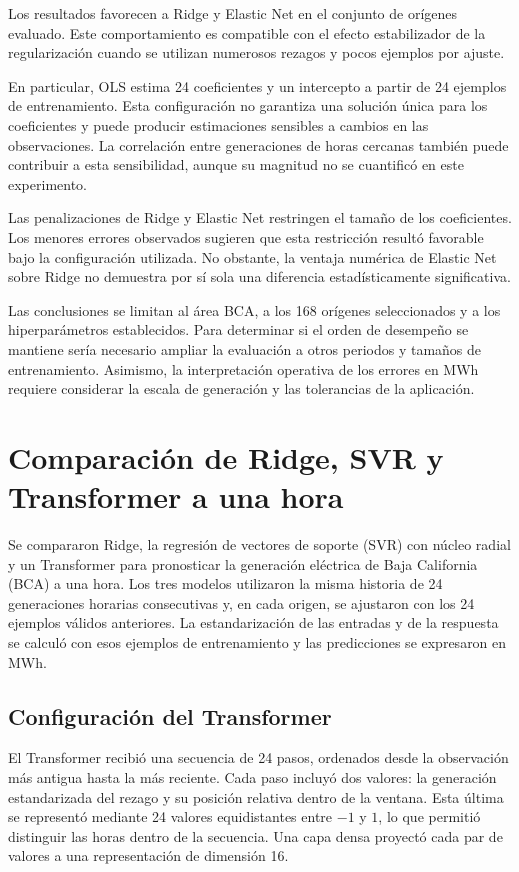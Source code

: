 Los resultados favorecen a Ridge y Elastic Net en el conjunto de orígenes evaluado. Este comportamiento es compatible con el efecto estabilizador de la regularización cuando se utilizan numerosos rezagos y pocos ejemplos por ajuste.

En particular, OLS estima 24 coeficientes y un intercepto a partir de 24 ejemplos de entrenamiento. Esta configuración no garantiza una solución única para los coeficientes y puede producir estimaciones sensibles a cambios en las observaciones. La correlación entre generaciones de horas cercanas también puede contribuir a esta sensibilidad, aunque su magnitud no se cuantificó en este experimento.

Las penalizaciones de Ridge y Elastic Net restringen el tamaño de los coeficientes. Los menores errores observados sugieren que esta restricción resultó favorable bajo la configuración utilizada. No obstante, la ventaja numérica de Elastic Net sobre Ridge no demuestra por sí sola una diferencia estadísticamente significativa.

Las conclusiones se limitan al área BCA, a los 168 orígenes seleccionados y a los hiperparámetros establecidos. Para determinar si el orden de desempeño se mantiene sería necesario ampliar la evaluación a otros periodos y tamaños de entrenamiento. Asimismo, la interpretación operativa de los errores en MWh requiere considerar la escala de generación y las tolerancias de la aplicación.

\section{Comparación de Ridge, SVR y Transformer a una hora}
\label{sec:comparacion-ridge-svr-transformer}

Se compararon Ridge, la regresión de vectores de soporte (SVR) con núcleo radial y un Transformer para pronosticar la generación eléctrica de Baja California (BCA) a una hora. Los tres modelos utilizaron la misma historia de 24 generaciones horarias consecutivas y, en cada origen, se ajustaron con los 24 ejemplos válidos anteriores. La estandarización de las entradas y de la respuesta se calculó con esos ejemplos de entrenamiento y las predicciones se expresaron en MWh.

\subsection{Configuración del Transformer}

El Transformer recibió una secuencia de 24 pasos, ordenados desde la observación más antigua hasta la más reciente. Cada paso incluyó dos valores: la generación estandarizada del rezago y su posición relativa dentro de la ventana. Esta última se representó mediante 24 valores equidistantes entre \(-1\) y \(1\), lo que permitió distinguir las horas dentro de la secuencia. Una capa densa proyectó cada par de valores a una representación de dimensión 16.


